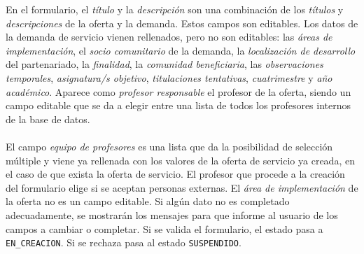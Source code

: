 \documentclass[11pt]{book}
\begin{document}
 En el formulario, el \emph{título} y la \emph{descripción } son una combinación de los \emph{títulos} y \emph{descripciones} de la oferta y la demanda. Estos campos son editables. Los datos de la demanda de servicio vienen rellenados, pero no son editables:  las \emph{áreas de implementación}, el \emph{socio comunitario} de la demanda, la \emph{localización de desarrollo} del partenariado, la \emph{finalidad}, la \emph{comunidad beneficiaria}, las \emph{observaciones temporales}, \emph{asignatura/s objetivo}, \emph{titulaciones tentativas}, \emph{cuatrimestre} y \emph{año académico}. Aparece como \emph{profesor responsable} el profesor de la oferta, siendo un campo editable que se da a elegir entre una lista de todos los profesores internos de la base de datos.\\\\
 El campo \emph{equipo de profesores} es una lista que da la posibilidad de selección múltiple y viene ya rellenada con los valores de la oferta de servicio ya creada, en el caso de que exista la oferta de servicio. El profesor que procede a la creación del formulario elige si se aceptan personas externas. El \emph{área de implementación} de la oferta no es un campo editable. Si algún dato no es completado adecuadamente, se mostrarán los mensajes para que informe al usuario de los campos a cambiar o completar. Si se valida el formulario, el estado pasa a \texttt{EN\_CREACION}. Si se rechaza pasa al estado \texttt{SUSPENDIDO}.
 \\\\
\end{document}
